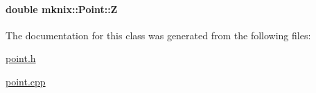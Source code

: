 \hypertarget{classmknix_1_1_point_a1742974a0d33897c3b04bc420ef87d31}{
\paragraph[{Z}]{\setlength{\rightskip}{0pt plus 5cm}double mknix\-::\-Point\-::\-Z\hspace{0.3cm}{\ttfamily [protected]}}}\label{classmknix_1_1_point_a1742974a0d33897c3b04bc420ef87d31}


The documentation for this class was generated from the following files\-:\begin{DoxyCompactItemize}
\item 
\hyperlink{point_8h}{point.\-h}\item 
\hyperlink{point_8cpp}{point.\-cpp}\end{DoxyCompactItemize}
